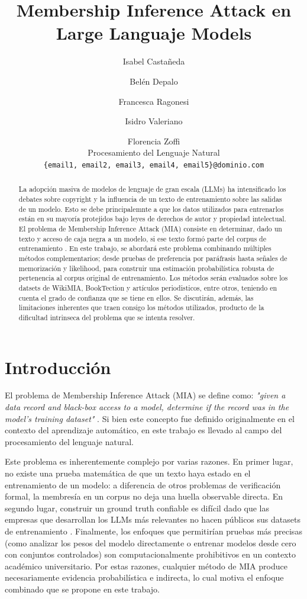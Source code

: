 \documentclass[11pt]{article}
\title{Membership Inference Attack en Large Languaje Models}
\author{Isabel Castañeda \and Belén Depalo \and Francesca Ragonesi \and Isidro Valeriano \and Florencia Zoffi \\
  Procesamiento del Lenguaje Natural \\
  \texttt{\{email1, email2, email3, email4, email5\}@dominio.com}}
\begin{document}
\maketitle

\begin{abstract}
La adopción masiva de modelos de lenguaje de gran escala (LLMs) ha intensificado 
los debates sobre copyright y la influencia de un texto de entrenamiento sobre las salidas de un modelo. Esto se debe principalemnte a que los datos utilizados para 
entrenarlos están en su mayoría protejidos bajo leyes de derechos de autor y propiedad intelectual. El problema de Membership Inference 
Attack (MIA) consiste en determinar, dado un texto y acceso de caja negra a un 
modelo, si ese texto formó parte del corpus de entrenamiento \citep{shokri2017membership}. 
En este trabajo, se abordará este problema combinando múltiples métodos 
complementarios; desde pruebas de preferencia por paráfrasis hasta señales de 
memorización y likelihood, para construir una estimación probabilística robusta 
de pertenencia al corpus original de entrenamiento. Los métodos serán evaluados sobre los datsets de WikiMIA, BookTection y artículos periodisticos, entre otros, teniendo en cuenta el grado de confianza que se tiene en ellos. Se discutirán, además, las limitaciones inherentes que traen consigo los métodos utilizados, producto de la dificultad intrinseca del problema que se intenta resolver.
\end{abstract}

\section{Introducción}
El problema de Membership Inference Attack (MIA) se define como: \textit{"given 
a data record and black-box access to a model, determine if the record was in 
the model's training dataset"} \citep{shokri2017membership}. Si bien este 
concepto fue definido originalmente en el contexto del aprendizaje automático, 
en este trabajo es llevado al campo del procesamiento del lenguaje natural.

Este problema es inherentemente complejo por varias razones. En primer lugar, 
no existe una prueba matemática de que un texto haya estado en el entrenamiento 
de un modelo: a diferencia de otros problemas de verificación formal, la 
membresía en un corpus no deja una huella observable directa. En segundo lugar, 
construir un ground truth confiable es difícil dado que las empresas que 
desarrollan los LLMs más relevantes no hacen públicos sus datasets de 
entrenamiento \citep{duan2024membership}. Finalmente, los enfoques que 
permitirían pruebas más precisas (como analizar los pesos del modelo 
directamente o entrenar modelos desde cero con conjuntos controlados) son 
computacionalmente prohibitivos en un contexto académico universitario. Por 
estas razones, cualquier método de MIA produce necesariamente evidencia 
probabilística e indirecta, lo cual motiva el enfoque combinado que se propone 
en este trabajo.
\end{document}
